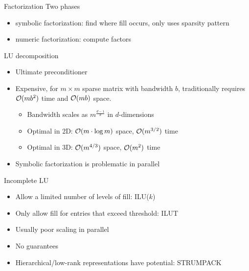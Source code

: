 \begin{frame}[shrink=5]{Factorization}
  Two phases
  \begin{itemize}
  \item symbolic factorization: find where fill occurs, only uses sparsity pattern
  \item numeric factorization: compute factors
  \end{itemize}
  \begin{block}{LU decomposition}
    \begin{itemize}
    \item Ultimate preconditioner
    \item Expensive, for $m\times m$ sparse matrix with bandwidth $b$, traditionally requires $\mathcal{O}(mb^2)$ time and $\mathcal{O}(mb)$ space.
      \begin{itemize}
      \item Bandwidth scales as $m^{\frac{d-1}{d}}$ in $d$-dimensions
      \item Optimal in 2D: $\mathcal{O}(m \cdot \log m)$ space, $\mathcal{O}(m^{3/2})$ time
      \item Optimal in 3D: $\mathcal{O}(m^{4/3})$ space, $\mathcal{O}(m^2)$ time
      \end{itemize}
    \item Symbolic factorization is problematic in parallel
    \end{itemize}
  \end{block}
  \begin{block}{Incomplete LU}
    \begin{itemize}
    \item Allow a limited number of levels of fill:
      ILU($k$)
    \item Only allow fill for entries that exceed threshold: ILUT
    \item Usually poor scaling in parallel
    \item No guarantees
    \item Hierarchical/low-rank representations have potential: STRUMPACK
    \end{itemize}
  \end{block}
\end{frame}

